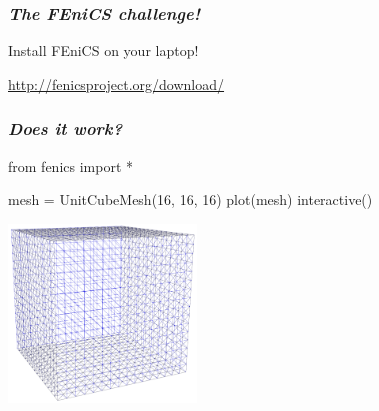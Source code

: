 \begin{frame}
  \frametitle{\emph{The FEniCS challenge!}}

  \begin{center}
    Install FEniCS on your laptop!

    \vspace{2cm}

    \url{http://fenicsproject.org/download/}
  \end{center}

\end{frame}

\begin{frame}[fragile]
  \frametitle{\emph{Does it work?}}

  \begin{python}
from fenics import *

mesh = UnitCubeMesh(16, 16, 16)
plot(mesh)
interactive()
 \end{python}

  \begin{center}
    \includegraphics[width=5cm]{png/unitcube16.png}
  \end{center}

\end{frame}
